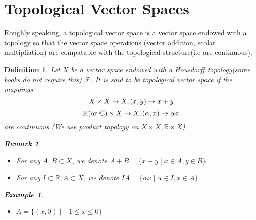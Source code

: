 \documentclass{article}
\newtheorem*{definition}{Definition}
\newtheorem*{remark}{Remark}
\newtheorem*{example}{Example}
\begin{document}
\section*{Topological Vector Spaces}
Roughly speaking, a topological vector space is a vector space endowed with a topology so that the vector space operations
(vector addition, scalar multipliation) are compatable with the topological structure(i.e are continuous).
\begin{definition}
    Let $X$ be a vector space endowed with a Housdorff topology(some books do not require this) $\mathcal{F}$.
    It is said to be topological vector space if the mappings
    \[
        X \times X \rightarrow X, (x, y) \rightarrow x + y \\
    \]
    \[
        \mathbb{R}(\textnormal{or } \mathbb{C}) \times X \rightarrow X, (\alpha, x) \rightarrow \alpha x
    \]
    are continuous.(We use product topology on $X \times X, \mathbb{R} \times X$)
    \begin{remark} \hfill
        \begin{itemize}
            \item For any $A, B \subset X$, we denote $A + B = \{ x + y \mid x \in A, y \in B\}$
            \item For any $I \subset \mathbb{R}, A \subset X$, we denote $I \dot A = \{ \alpha x \mid \alpha \in I, x \in A\}$
        \end{itemize}
        \begin{example}
            \begin{itemize}
                \item $A = \{(x, 0) \mid -1 \le x \le 0\}$
            \end{itemize}
        \end{example}
    \end{remark}
\end{definition}
\end{document}

